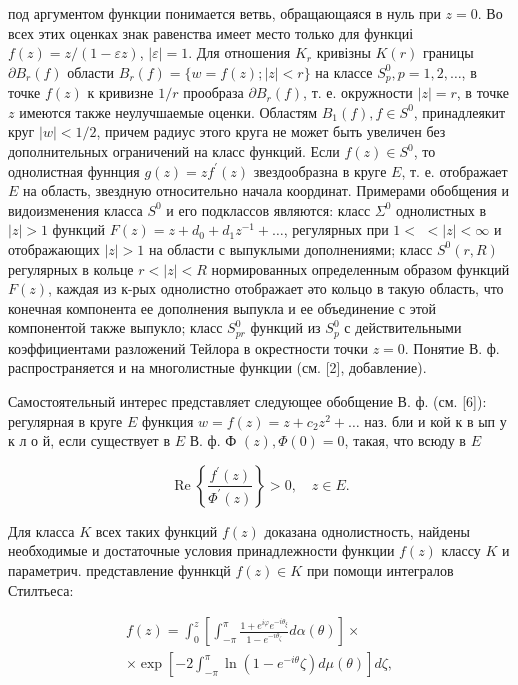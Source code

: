 \documentclass[10pt]{article}
\begin{document}
под аргументом функции понимается ветвь, обращающаяся в нуль при $z=0$. Во всех этих оценках знак равенства имеет место только для функциі $f(z)=z /(1-\varepsilon z)$, $|\varepsilon|=1$. Для отношения $K_{r}$ кривізны $K(r)$ границы $\partial B_{r}(f)$ области $B_{r}(f)=\{w=f(z) ;|z|<r\}$ на классе $S_{p}^{0}, p=1,2, \ldots$, в точке $f(z)$ к кривизне $1 / r$ прообраза $\partial B_{r}(f)$, т. е. окружности $|z|=r$, в точке $z$ имеются также неулучшаемые оценки. Областям $B_{1}(f), f \in S^{0}$, принадлеякит круг $|w|<1 / 2$, причем радиус этого круга не может быть увеличен без дополнительных ограничений на класс функций. Если $f(z) \in S^{0}$, то однолистная фуннция $g(z)=z f^{\prime}(z)$ звездообразна в круге $E$, т. е. отображает $E$ на область, звездную относительно начала координат. Примерами обобщения и видоизменения класса $S^{0}$ и его подклассов являются: класс $\Sigma^{0}$ однолистных в $|z|>1$ функций $F(z)=z+d_{0}+d_{1} z^{-1}+\ldots$, регулярных при $1<$ $<|z|<\infty$ и отображающих $|z|>1$ на области с выпуклыми дополнениями; класс $S^{0}(r, R)$ регулярных в кольце $r<|z|<R$ нормированных определенным образом функций $F(z)$, каждая из к-рых однолистно отображает әто кольцо в такую область, что конечная компонента ее дополнения выпукла и ее объединение с этой компонентой также выпукло; класс $S_{p r}^{0}$ функций из $S_{p}^{0}$ с действительными коэффициентами разложений Тейлора в окрестности точки $z=0$. Понятие В. ф. распространяется и на многолистные функции (см. [2], добавление).



Самостоятельный интерес представляет следующее обобщение В. ф. (см. [6]): регулярная в круге $E$ функция $w=f(z)=z+c_{2} z^{2}+\ldots$ наз. бли и кой к в ып у к л о й, если существует в $E$ В. ф. Ф $(z), \Phi(0)=0$, такая, что всюду в $E$



\[

\operatorname{Re}\left\{\frac{f^{\prime}(z)}{\Phi^{\prime}(z)}\right\}>0, \quad z \in E .

\]



Для класса $K$ всех таких функций $f(z)$ доказана однолистность, найдены необходимые и достаточные условия принадлежности функции $f(z)$ классу $K$ и параметрич. представление фуннкцй $f(z) \in K$ при помощи интегралов Стилтьеса:



\[

\begin{gathered}

f(z)=\int_{0}^{z}\left[\int_{-\pi}^{\pi} \frac{1+e^{i \varphi} e^{-i \theta_{\xi}}}{1-e^{-i \theta_{\zeta}}} d \alpha(\theta)\right] \times \\

\times \exp \left[-2 \int_{-\pi}^{\pi} \ln \left(1-e^{-i \theta} \zeta\right) d \mu(\theta)\right] d \zeta,

\end{gathered}

\]
\end{document}
